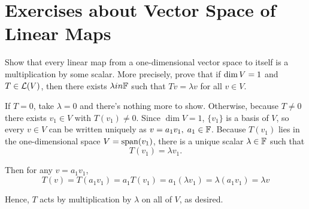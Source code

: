 \section*{Exercises about Vector Space of Linear Maps}

%

\begin{xrcs}
  Show that every linear map from a one-dimensional vector space to itself is a multiplication by some scalar. More precisely, prove that if $\operatorname{dim} V = 1$ and $T \in \mathcal{L} (V)$, then there exists $\lambda in \mathbb{F}$ such that $Tv = \lambda v$ for all $v \in V$.

  \begin{xprf}
    If $T = 0$, take $\lambda = 0$ and there's nothing more to show. Otherwise, because $T \neq 0$ there exists $v_1 \in V$ with $T(v_1) \neq 0$. Since $\dim V = 1$, $\{v_1\}$ is a basis of $V$, so every $v \in V$ can be written uniquely as $v=a_1 v_1, \; a_1 \in \mathbb{F}$. Because $T(v_1)$ lies in the one-dimensional space $V=\operatorname{span} (v_1)$, there is a unique scalar $\lambda \in \mathbb{F}$ such that
    \begin{equation}
      T(v_1) = \lambda v_1.
    \end{equation}

    Then for any $v = a_1 v_1$,
    \begin{equation}
      T(v) = T(a_1 v_1) = a_1 T(v_1) = a_1 (\lambda v_1) = \lambda (a_1 v_1) = \lambda v
    \end{equation}

    Hence, $T$ acts by multiplication by $\lambda$ on all of $V$, as desired.
  \end{xprf}
\end{xrcs}


